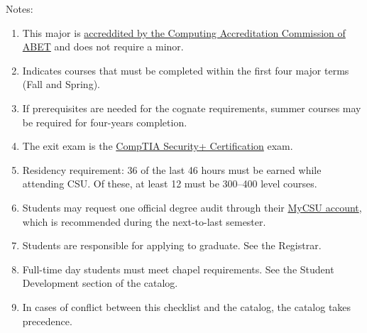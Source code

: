 Notes:%
\begin{enumerate}\footnotesize
	\item This major is
		\href{https://www.abet.org/accreditation/what-is-accreditation/why-abet-accreditation-matters/}{accreddited by the Computing Accreditation Commission of ABET} and does not require a minor.
	\item\label{note:bs-cyber:early-major-terms} Indicates courses that must be completed within the first four major terms (Fall and Spring).
	\item If prerequisites are needed for the cognate requirements, summer courses may be required for four-years completion.
	\item\label{note:bs-cyber:exit-exam} The exit exam is the \href{https://www.comptia.org/certifications/security}{CompTIA Security+ Certification} exam.
	\item Residency requirement: 36 of the last 46 hours must be earned while attending CSU\@. Of these, at least 12 must be 300--400 level courses.
	\item Students may request one official degree audit through their \href{https://portal.csuniv.edu/}{MyCSU account}, which is recommended during the next-to-last semester.
	\item Students are responsible for applying to graduate. See the Registrar.
	\item Full-time day students must meet chapel requirements. See the Student Development section of the catalog.
	\item In cases of conflict between this checklist and the catalog, the catalog takes precedence.
\end{enumerate}